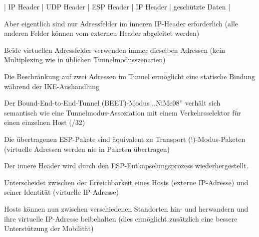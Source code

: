 \documentclass[a4paper]{article}
\begin{document}
\begin{multicols}{3}
\begin{itemize*}
\begin{itemize*}
                  \item | IP Header | UDP Header | ESP Header | IP Header | geschützte Daten |
            \end{itemize*}
            \item Aber eigentlich sind nur Adressfelder im inneren IP-Header erforderlich (alle anderen Felder können vom externen Header abgeleitet werden)
            \item Beide virtuellen Adressfelder verwenden immer dieselben Adressen (kein Multiplexing wie in üblichen Tunnelmodusszenarien)
            \item Die Beschränkung auf zwei Adressen im Tunnel ermöglicht eine statische Bindung während der IKE-Aushandlung
            \item Der Bound-End-to-End-Tunnel (BEET)-Modus ,,NiMe08'' verhält sich semantisch wie eine Tunnelmodus-Assoziation mit einem Verkehrsselektor für einen einzelnen Host (/32)
            \item Die übertragenen ESP-Pakete sind äquivalent zu Transport (!)-Modus-Paketen (virtuelle Adressen werden nie in Paketen übertragen)
            \item Der innere Header wird durch den ESP-Entkapselungsprozess wiederhergestellt.
            \item Unterscheidet zwischen der Erreichbarkeit eines Hosts (externe IP-Adresse) und seiner Identität (virtuelle IP-Adresse)
            \item Hosts können nun zwischen verschiedenen Standorten hin- und herwandern und ihre virtuelle IP-Adresse beibehalten (dies ermöglicht zusätzlich eine bessere Unterstützung der Mobilität)
      \end{itemize*}


\end{multicols}
\end{document}

